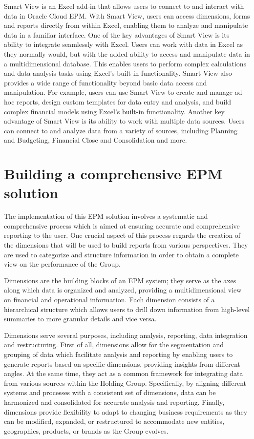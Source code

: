 \documentclass[12pt,a4paper,openright,twoside]{book}
\begin{document}
Smart View is an Excel add-in that allows users to connect to and interact with data in Oracle Cloud EPM. 
%
With Smart View, users can access dimensions, forms and reports directly from within Excel, enabling them to analyze and manipulate data in a familiar interface.
%
One of the key advantages of Smart View is its ability to integrate seamlessly with Excel. 
%
Users can work with data in Excel as they normally would, but with the added ability to access and manipulate data in a multidimensional database. 
%
This enables users to perform complex calculations and data analysis tasks using Excel's built-in functionality.
%
Smart View also provides a wide range of functionality beyond basic data access and manipulation. 
%
For example, users can use Smart View to create and manage ad-hoc reports, design custom templates for data entry and analysis, and build complex financial models using Excel's built-in functionality.
%
Another key advantage of Smart View is its ability to work with multiple data sources. 
%
Users can connect to and analyze data from a variety of sources, including Planning and Budgeting, Financial Close and Consolidation and more. 

\section{Building a comprehensive EPM solution}

The implementation of this EPM solution involves a systematic and comprehensive process which is aimed at ensuring accurate and comprehensive reporting to the user.
%
One crucial aspect of this process regards the creation of the dimensions that will be used to build reports from various perspectives. 
%
They are used to categorize and structure information in order to obtain a complete view on the performance of the Group.

Dimensions are the building blocks of an EPM system; they serve as the axes along which data is organized and analyzed, providing a multidimensional view on financial and operational information. 
%
Each dimension consists of a hierarchical structure which allows users to drill down information from high-level summaries to more granular details and vice versa.

Dimensions serve several purposes, including analysis, reporting, data integration and restructuring.
%
First of all, dimensions allow for the segmentation and grouping of data which facilitate analysis and reporting by enabling users to generate reports based on specific dimensions, providing insights from different angles.
%
At the same time, they act as a common framework for integrating data from various sources within the Holding Group. 
%
Specifically, by aligning different systems and processes with a consistent set of dimensions, data can be harmonized and consolidated for accurate analysis and reporting.
%
Finally, dimensions provide flexibility to adapt to changing business requirements as they can be modified, expanded, or restructured to accommodate new entities, geographies, products, or brands as the Group evolves.
\end{document}

